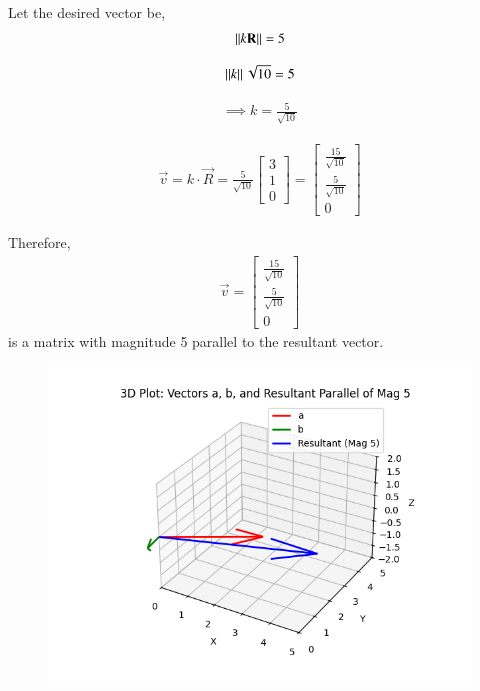 \documentclass[journal]{IEEEtran}
\begin{document}
Let the desired vector be,
\begin{align}
    \left\lVert k\mathbf{R}\right\rVert = 5
\end{align}

\begin{align}
     \left\lVert k\right\rVert\sqrt{10} = 5 
\end{align}  

\begin{align}
\implies k = \frac{5}{\sqrt{10}}
\end{align}


\begin{align}
\vec{v} = k\cdot {\vec{R}} = \frac{5}{\sqrt{10}} \begin{bmatrix} 3 \\ 1 \\ 0 \end{bmatrix}
= \begin{bmatrix} \frac{15}{\sqrt{10}} \\ \frac{5}{\sqrt{10}} \\ 0 \end{bmatrix}
\end{align}

Therefore,
\begin{align}
\vec{v} = \begin{bmatrix}
\frac{15}{\sqrt{10}} \\
\frac{5}{\sqrt{10}} \\
0
\end{bmatrix}
\end{align}
is a matrix with magnitude 5 parallel to the resultant vector.

\begin{figure}[H]
\begin{center}
\includegraphics[width=0.75\columnwidth]{figs/graph.png}
\end{center}
\caption{}
\label{fig:Fig}
\end{figure}
\end{document}
